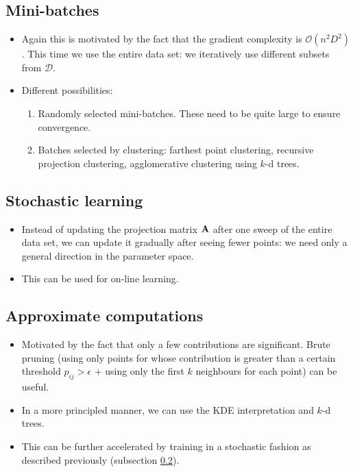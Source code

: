\documentclass[11pt]{article} %
\begin{document}
	\subsection{Mini-batches}
		\begin{itemize}
			\item Again this is motivated by the fact that the gradient complexity is $\mathcal{O}(n^2D^2)$. This time we use the entire data set: we iteratively use different subsets from $\mathcal{D}$.
			\item Different possibilities:
				\begin{enumerate}
					\item Randomly selected mini-batches. These need to be quite large to ensure convergence.
					\item Batches selected by clustering: farthest point clustering, recursive projection clustering, agglomerative clustering using $k$-d trees.
				\end{enumerate}
		\end{itemize}
	\subsection{Stochastic learning}
	\label{subsec:stochastic-learning}
		\begin{itemize}
			\item Instead of updating the projection matrix $\mathbf{A}$ after one sweep of the entire data set, we can update it gradually after seeing fewer points: we need only a general direction in the parameter space.
			\item This can be used for on-line learning.
		\end{itemize}
	\subsection{Approximate computations}
		\begin{itemize}
			\item Motivated by the fact that only a few contributions are significant. Brute pruning (using only points for whose contribution is greater than a certain threshold $p_{ij}>\epsilon$ + using only the first $k$ neighbours for each point) can be useful.
			\item In a more principled manner, we can use the KDE interpretation and  $k$-d trees.
			\item This can be further accelerated by training in a stochastic fashion as described previously (subsection \ref{subsec:stochastic-learning}).
		\end{itemize}
\end{document}
